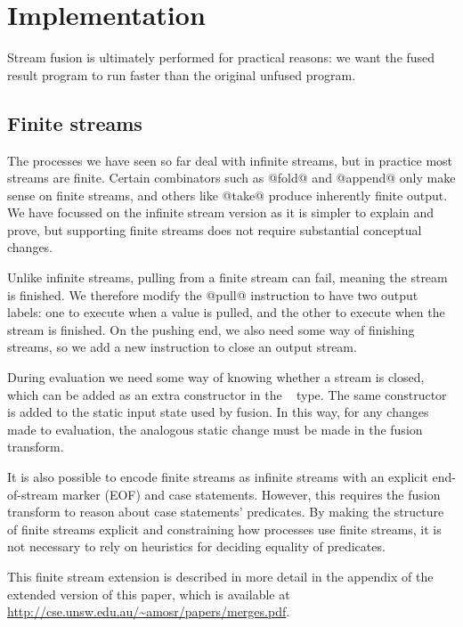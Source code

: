 
\section{Implementation}
\label{s:Evaluation}

Stream fusion is ultimately performed for practical reasons: we want the fused result program to run faster than the original unfused program.


\subsection{Finite streams}
\label{s:Finite}

The processes we have seen so far deal with infinite streams, but in practice most streams are finite. Certain combinators such as @fold@ and @append@ only make sense on finite streams, and others like @take@ produce inherently finite output. We have focussed on the infinite stream version as it is simpler to explain and prove, but supporting finite streams does not require substantial conceptual changes.

Unlike infinite streams, pulling from a finite stream can fail, meaning the stream is finished. We therefore modify the @pull@ instruction to have two output labels: one to execute when a value is pulled, and the other to execute when the stream is finished. On the pushing end, we also need some way of finishing streams, so we add a new instruction to close an output stream.

During evaluation we need some way of knowing whether a stream is closed, which can be added as an extra constructor in the \InputState~ type. The same constructor is added to the static input state used by fusion. In this way, for any changes made to evaluation, the analogous static change must be made in the fusion transform.

It is also possible to encode finite streams as infinite streams with an explicit end-of-stream marker (EOF) and case statements. However, this requires the fusion transform to reason about case statements' predicates.
By making the structure of finite streams explicit and constraining how processes use finite streams, it is not necessary to rely on heuristics for deciding equality of predicates.

This finite stream extension is described in more detail in the appendix of the extended version of this paper, which is available at \url{http://cse.unsw.edu.au/~amosr/papers/merges.pdf}.

